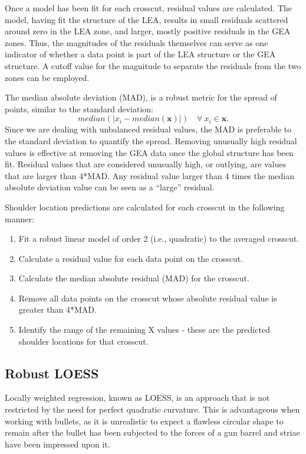\documentclass[]{article}
\begin{document}
Once a model has been fit for each crosscut, residual values are
calculated. The model, having fit the structure of the LEA, results in
small residuals scattered around zero in the LEA zone, and larger,
mostly positive residuals in the GEA zones. Thus, the magnitudes of the
residuals themselves can serve as one indicator of whether a data point
is part of the LEA structure or the GEA structure. A cutoff value for
the magnitude to separate the residuals from the two zones can be
employed.

The median absolute deviation (MAD), is a robust metric for the spread
of points, similar to the standard deviation:
\[median(|x_i- median(\mathbf{x})|) \quad \forall\ x_i \in \mathbf{x}.\]
Since we are dealing with unbalanced residual values, the MAD is
preferable to the standard deviation to quantify the spread. Removing
unusually high residual values is effective at removing the GEA data
once the global structure has been fit. Residual values that are
considered unusually high, or outlying, are values that are larger than
4*MAD. Any residual value larger than 4 times the median absolute
deviation value can be seen as a ``large'' residual.

Shoulder location predictions are calculated for each crosscut in the
following manner:\\

\begin{enumerate}
\item Fit a robust linear model of order 2 (i.e., quadratic) to the averaged crosscut.   
\item Calculate a residual value for each data point on the crosscut.  
\item Calculate the median absolute residual (MAD) for the crosscut.  
\item Remove all data points on the crosscut whose absolute residual value is greater than 4*MAD.  
\item Identify the range of the remaining X values - these are the predicted shoulder locations for that crosscut.   
\end{enumerate}

\subsection{Robust LOESS}

Locally weighted regression, known as LOESS, is an approach that is not
restricted by the need for perfect quadratic curvature. This is
advantageous when working with bullets, as it is unrealistic to expect a
flawless circular shape to remain after the bullet has been subjected to
the forces of a gun barrel and striae have been impressed upon it.
\end{document}
